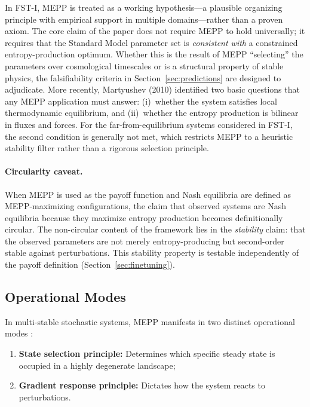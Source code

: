 \documentclass[12pt,a4paper]{article}
\theoremstyle{remark}
\begin{document}
In FST-I, MEPP is treated as a working hypothesis---a plausible organizing principle with empirical support in multiple domains---rather than a proven axiom. The core claim of the paper does not require MEPP to hold universally; it requires that the Standard Model parameter set is \emph{consistent with} a constrained entropy-production optimum. Whether this is the result of MEPP ``selecting'' the parameters over cosmological timescales or is a structural property of stable physics, the falsifiability criteria in Section~\ref{sec:predictions} are designed to adjudicate. More recently, Martyushev (2010) \citep{Martyushev2010} identified two basic questions that any MEPP application must answer: (i)~whether the system satisfies local thermodynamic equilibrium, and (ii)~whether the entropy production is bilinear in fluxes and forces. For the far-from-equilibrium systems considered in FST-I, the second condition is generally not met, which restricts MEPP to a heuristic stability filter rather than a rigorous selection principle.

\paragraph{Circularity caveat.} When MEPP is used as the payoff function and Nash equilibria are defined as MEPP-maximizing configurations, the claim that observed systems are Nash equilibria because they maximize entropy production becomes definitionally circular. The non-circular content of the framework lies in the \emph{stability} claim: that the observed parameters are not merely entropy-producing but second-order stable against perturbations. This stability property is testable independently of the payoff definition (Section~\ref{sec:finetuning}).

\subsection{Operational Modes}

In multi-stable stochastic systems, MEPP manifests in two distinct operational modes \citep{MartyushevSeleznev2006}:
\begin{enumerate}
    \item \textbf{State selection principle:} Determines which specific steady state is occupied in a highly degenerate landscape;
    \item \textbf{Gradient response principle:} Dictates how the system reacts to perturbations.
\end{enumerate}
\end{document}
